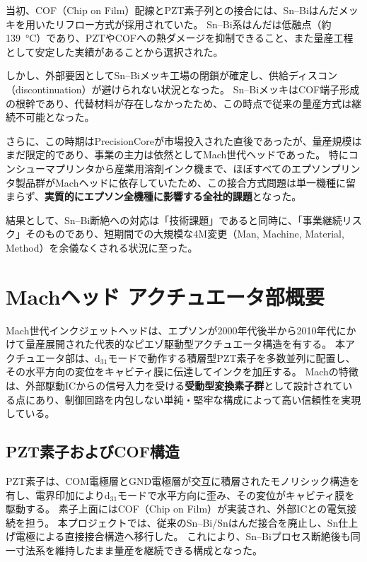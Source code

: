 \documentclass[conference]{IEEEtran}
\begin{document}
当初、COF（Chip on Film）配線とPZT素子列との接合には、Sn–Biはんだメッキを用いたリフロー方式が採用されていた。  
Sn–Bi系はんだは低融点（約\SI{139}{\degreeCelsius}）であり、PZTやCOFへの熱ダメージを抑制できること、また量産工程として安定した実績があることから選択された。  

しかし、外部要因としてSn–Biメッキ工場の閉鎖が確定し、供給ディスコン（discontinuation）が避けられない状況となった。  
Sn–BiメッキはCOF端子形成の根幹であり、代替材料が存在しなかったため、この時点で従来の量産方式は継続不可能となった。  

さらに、この時期はPrecisionCoreが市場投入された直後であったが、量産規模はまだ限定的であり、事業の主力は依然としてMach世代ヘッドであった。  
特にコンシューマプリンタから産業用溶剤インク機まで、ほぼすべてのエプソンプリンタ製品群がMachヘッドに依存していたため、この接合方式問題は単一機種に留まらず、\textbf{実質的にエプソン全機種に影響する全社的課題}となった。  

結果として、Sn–Bi断絶への対応は「技術課題」であると同時に、「事業継続リスク」そのものであり、短期間での大規模な4M変更（Man, Machine, Material, Method）を余儀なくされる状況に至った。

\section{Machヘッド アクチュエータ部概要}

Mach世代インクジェットヘッドは、エプソンが2000年代後半から2010年代にかけて量産展開された代表的なピエゾ駆動型アクチュエータ構造を有する。  
本アクチュエータ部は、d$_{31}$モードで動作する積層型PZT素子を多数並列に配置し、その水平方向の変位をキャビティ膜に伝達してインクを加圧する。  
Machの特徴は、外部駆動ICからの信号入力を受ける\textbf{受動型変換素子群}として設計されている点にあり、制御回路を内包しない単純・堅牢な構成によって高い信頼性を実現している。

\subsection{PZT素子およびCOF構造}

PZT素子は、COM電極層とGND電極層が交互に積層されたモノリシック構造を有し、電界印加によりd$_{31}$モードで水平方向に歪み、その変位がキャビティ膜を駆動する。  
素子上面にはCOF（Chip on Film）が実装され、外部ICとの電気接続を担う。  
本プロジェクトでは、従来のSn–Bi/Snはんだ接合を廃止し、Sn仕上げ電極による直接接合構造へ移行した。  
これにより、Sn–Biプロセス断絶後も同一寸法系を維持したまま量産を継続できる構成となった。
\end{document}
